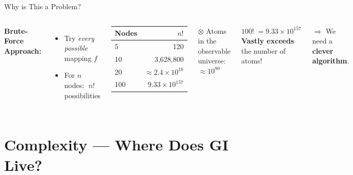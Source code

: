 \documentclass[10pt, aspectratio=169]{beamer}
\newcommand{\faArrowRight}{$\Rightarrow$}
\newcommand{\faAtom}{$\otimes$}
\begin{document}
\begin{frame}{Why is This a \alert{Problem}?}
	\begin{columns}[T]
		\textbf{Brute-Force Approach:}
		\begin{itemize}
			\item Try \textit{every possible} mapping $f$
			\item For $n$ nodes: $\;n!\;$ possibilities
		\end{itemize}

		\vspace{0.6em}
		\begin{tcolorbox}[redbox, title={Scale of $n!$}]
			\small
			\begin{tabular}{lr}
				\toprule
				Nodes & $n!$                         \\
				\midrule
				5     & 120                          \\
				10    & 3,628,800                    \\
				20    & $\approx 2.4 \times 10^{18}$ \\
				100   & $9.33 \times 10^{157}$       \\
				\bottomrule
			\end{tabular}
		\end{tcolorbox}

		\vspace{1em}
		\begin{tcolorbox}[keybox]
			\faAtom\; Atoms in the observable universe:\\[0.3em]
			\centering $\approx 10^{80}$
		\end{tcolorbox}

		\vspace{0.5em}
		\begin{tcolorbox}[redbox]
			$100!\; = 9.33\times 10^{157}$\\[0.2em]
			\textbf{Vastly exceeds} the number of atoms!
		\end{tcolorbox}

		\vspace{0.5em}
		\faArrowRight\; We need a \textbf{clever algorithm}.
	\end{columns}
\end{frame}

\section{Complexity — Where Does GI Live?}
\end{document}

